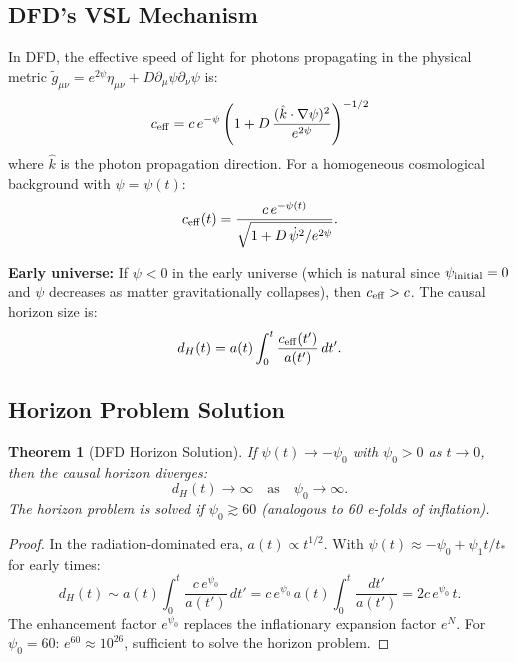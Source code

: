 \documentclass[11pt,a4paper]{article}
\newtheorem{theorem}{Theorem}
\begin{document}
\subsection{DFD's VSL Mechanism}

In DFD, the effective speed of light for photons propagating in the physical metric $\tilde{g}_{\mu\nu} = e^{2\psi}\eta_{\mu\nu} + D\partial_\mu\psi\partial_\nu\psi$ is:
\begin{equation}\label{eq:c-eff}
c_{\rm eff} = c\,e^{-\psi}\left(1 + D\,\frac{(\hat{k}\cdot\nabla\psi)^2}{e^{2\psi}}\right)^{-1/2}
\end{equation}
where $\hat{k}$ is the photon propagation direction. For a homogeneous cosmological background with $\psi = \psi(t)$:
\begin{equation}\label{eq:c-cosmo}
c_{\rm eff}(t) = \frac{c\,e^{-\psi(t)}}{\sqrt{1 + D\,\dot\psi^2/e^{2\psi}}}.
\end{equation}

\textbf{Early universe:} If $\psi < 0$ in the early universe (which is natural since $\psi_{\rm initial} = 0$ and $\psi$ decreases as matter gravitationally collapses), then $c_{\rm eff} > c$. The causal horizon size is:
\begin{equation}
d_H(t) = a(t)\int_0^t \frac{c_{\rm eff}(t')}{a(t')}\,dt'.
\end{equation}

\subsection{Horizon Problem Solution}

\begin{theorem}[DFD Horizon Solution]
If $\psi(t) \to -\psi_0$ with $\psi_0 > 0$ as $t \to 0$, then the causal horizon diverges:
\begin{equation}
d_H(t) \to \infty \quad \text{as} \quad \psi_0 \to \infty.
\end{equation}
The horizon problem is solved if $\psi_0 \gtrsim 60$ (analogous to 60 e-folds of inflation).
\end{theorem}

\begin{proof}
In the radiation-dominated era, $a(t) \propto t^{1/2}$. With $\psi(t) \approx -\psi_0 + \psi_1 t/t_*$ for early times:
\begin{equation}
d_H(t) \sim a(t)\int_0^t \frac{c\,e^{\psi_0}}{a(t')}\,dt' = c\,e^{\psi_0}\,a(t)\int_0^t \frac{dt'}{a(t')} = 2c\,e^{\psi_0}\,t.
\end{equation}
The enhancement factor $e^{\psi_0}$ replaces the inflationary expansion factor $e^N$. For $\psi_0 = 60$: $e^{60} \approx 10^{26}$, sufficient to solve the horizon problem.
\end{proof}
\end{document}
